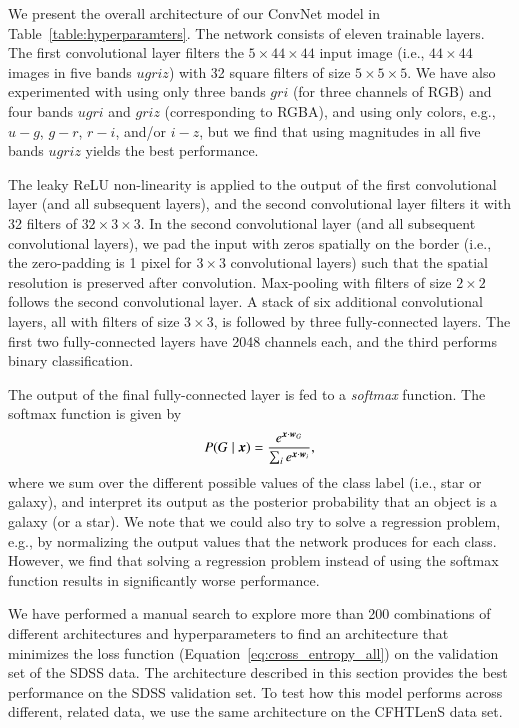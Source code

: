 \documentclass[fleqn,usenatbib]{mnras}
\newcommand{\eg}{{e.g., }}
\newcommand{\ie}{{i.e., }}
\begin{document}
We present the overall architecture of our ConvNet model in Table~\ref{table:hyperparamters}.
The network consists of eleven trainable layers.
The first convolutional layer filters the $5\times44\times44$ input image
(\ie $44\times44$ images in five bands $ugriz$) with 32 square filters of size $5\times5\times5$.
We have also experimented with using only three bands $gri$ (for three channels of RGB) and 
four bands $ugri$ and $griz$ (corresponding to RGBA),
and using only colors, \eg $u-g$, $g-r$, $r-i$, and/or $i-z$,
but we find that using magnitudes in all five bands $ugriz$ yields the best performance.

The leaky ReLU non-linearity is applied to the output of the first convolutional layer
(and all subsequent layers), and the second convolutional layer filters it
with 32 filters of $32\times3\times3$.
In the second convolutional layer (and all subsequent convolutional layers),
we pad the input with zeros spatially on the border
(\ie the zero-padding is 1 pixel for $3\times3$ convolutional layers)
such that the spatial resolution is preserved after convolution.
Max-pooling with filters of size $2\times2$ follows the second convolutional layer.
A stack of six additional convolutional layers, all with filters of size $3\times3$,
is followed by three fully-connected layers.
The first two fully-connected layers have 2048 channels each,
and the third performs binary classification.

The output of the final fully-connected layer is fed to a \textit{softmax} function.
The softmax function is given by
\begin{equation}
  P (G \mid \bmath{x}) = 
    \frac{ e^{ \bmath{x} \cdot \bmath{w}_G } }
    { \sum_{i} e^{ \bmath{x} \cdot \bmath{w}_i } },
\end{equation}
where we sum over the different possible values of the class label (\ie star or galaxy),
and interpret its output as the posterior probability that an object is a galaxy
(or a star).
We note that we could also try to solve a regression problem, \eg
by normalizing the output values that the network produces for each class.
However, we find that solving a regression problem instead of using
the softmax function results in significantly worse performance.

We have performed a manual search to explore more than 200 combinations of different architectures
and hyperparameters to find an architecture that minimizes the loss function
(Equation~\ref{eq:cross_entropy_all}) on the validation set of the SDSS data.
The architecture described in this section provides the best performance on
the SDSS validation set.
To test how this model performs across different, related data,
we use the same architecture on the CFHTLenS data set.
\end{document}
